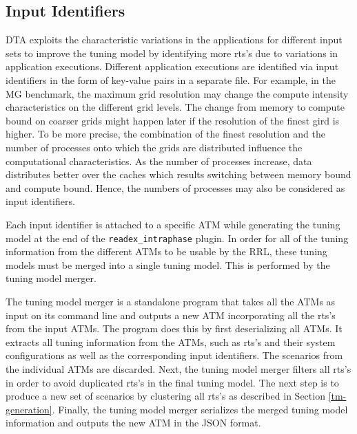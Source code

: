 \subsection{Input Identifiers} \label{sec:input}

DTA exploits the characteristic variations in the applications for different input sets to improve the tuning model by identifying more rts's due to variations in application executions. Different application executions are identified via input identifiers in the form of key-value pairs in a separate file. For example, in the MG benchmark, the maximum grid resolution may change the compute intensity characteristics on the different grid levels. The change from memory to compute bound on coarser grids might happen later if the resolution of the finest gird is higher. To be more precise, the combination of the finest resolution and the number of processes onto which the grids are distributed influence the computational characteristics. As the number of processes increase, data distributes better over the caches which results switching between memory bound and compute bound. Hence, the numbers of processes may also be considered as input identifiers. 

Each input identifier is attached to a specific ATM while generating the tuning model at the end of the \texttt{readex\_intraphase} plugin. In order for all of the tuning information from the different ATMs to be usable by the RRL, these tuning models must be merged into a single tuning model. This is performed by the tuning model merger.

The tuning model merger is a standalone program that takes all the ATMs as input on its command line and outputs a new ATM incorporating all the rts's from the input ATMs. The program does this by first deserializing all ATMs. It extracts all tuning information from the ATMs, such as rts's and their system configurations as well as the corresponding input identifiers. The scenarios from the individual ATMs are discarded. Next, the tuning model merger filters all rts's in order to avoid duplicated rts's in the final tuning model. The next step is to produce a new set of scenarios by clustering all rts's as described in Section \ref{tm-generation}. Finally, the tuning model merger serializes the merged tuning model information and outputs the new ATM in the JSON format.
